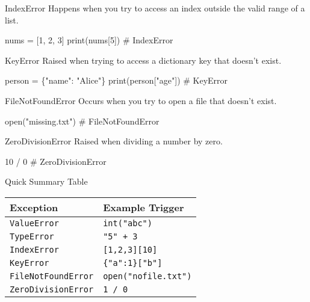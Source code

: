 \documentclass[
  letterpaper,
  DIV=11,
  numbers=noendperiod]{scrreprt}
\newenvironment{Shaded}{\begin{snugshade}}{\end{snugshade}}
\newcommand{\BuiltInTok}[1]{\textcolor[rgb]{0.00,0.23,0.31}{#1}}
\newcommand{\CommentTok}[1]{\textcolor[rgb]{0.37,0.37,0.37}{#1}}
\newcommand{\DecValTok}[1]{\textcolor[rgb]{0.68,0.00,0.00}{#1}}
\newcommand{\NormalTok}[1]{\textcolor[rgb]{0.00,0.23,0.31}{#1}}
\newcommand{\OperatorTok}[1]{\textcolor[rgb]{0.37,0.37,0.37}{#1}}
\newcommand{\StringTok}[1]{\textcolor[rgb]{0.13,0.47,0.30}{#1}}
\begin{document}
IndexError Happens when you try to access an index outside the valid
range of a list.

\begin{Shaded}
\begin{Highlighting}[]
\NormalTok{nums }\OperatorTok{=}\NormalTok{ [}\DecValTok{1}\NormalTok{, }\DecValTok{2}\NormalTok{, }\DecValTok{3}\NormalTok{]}
\BuiltInTok{print}\NormalTok{(nums[}\DecValTok{5}\NormalTok{])   }\CommentTok{\# IndexError}
\end{Highlighting}
\end{Shaded}

KeyError Raised when trying to access a dictionary key that doesn't
exist.

\begin{Shaded}
\begin{Highlighting}[]
\NormalTok{person }\OperatorTok{=}\NormalTok{ \{}\StringTok{"name"}\NormalTok{: }\StringTok{"Alice"}\NormalTok{\}}
\BuiltInTok{print}\NormalTok{(person[}\StringTok{"age"}\NormalTok{])   }\CommentTok{\# KeyError}
\end{Highlighting}
\end{Shaded}

FileNotFoundError Occurs when you try to open a file that doesn't exist.

\begin{Shaded}
\begin{Highlighting}[]
\BuiltInTok{open}\NormalTok{(}\StringTok{"missing.txt"}\NormalTok{)   }\CommentTok{\# FileNotFoundError}
\end{Highlighting}
\end{Shaded}

ZeroDivisionError Raised when dividing a number by zero.

\begin{Shaded}
\begin{Highlighting}[]
\DecValTok{10} \OperatorTok{/} \DecValTok{0}   \CommentTok{\# ZeroDivisionError}
\end{Highlighting}
\end{Shaded}

Quick Summary Table

\begin{longtable}[]{@{}ll@{}}
\toprule\noalign{}
Exception & Example Trigger \\
\midrule\noalign{}
\endhead
\bottomrule\noalign{}
\endlastfoot
\texttt{ValueError} & \texttt{int("abc")} \\
\texttt{TypeError} & \texttt{"5"\ +\ 3} \\
\texttt{IndexError} & \texttt{{[}1,2,3{]}{[}10{]}} \\
\texttt{KeyError} & \texttt{\{"a":1\}{[}"b"{]}} \\
\texttt{FileNotFoundError} & \texttt{open("nofile.txt")} \\
\texttt{ZeroDivisionError} & \texttt{1\ /\ 0} \\
\end{longtable}
\end{document}
